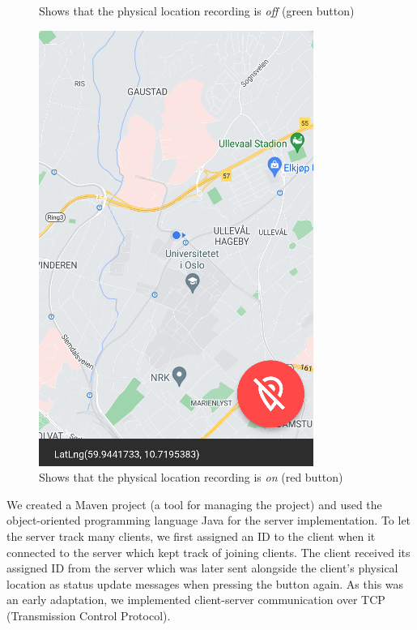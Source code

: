 \documentclass{article}
\begin{document}
\begin{figure}[H]
\begin{minipage}[c]{0.34\linewidth}
        \caption{Shows that the physical location recording is \emph{off} (green button)}
        \label{fig:recording_off}
    \end{minipage}
    \hfill
    \begin{minipage}[c]{0.34\linewidth}
        \includegraphics[width=\linewidth]{graphics/recording_on.png}
        \caption{Shows that the physical location recording is \emph{on} (red button)}
        \label{fig:recording_on}
    \end{minipage}
\end{figure}

We created a Maven project (a tool for managing the project) and used the object-oriented programming language Java for the server implementation. To let the server track many clients, we first assigned an ID to the client when it connected to the server which kept track of joining clients. The client received its assigned ID from the server which was later sent alongside the client's physical location as status update messages when pressing the button again. As this was an early adaptation, we implemented client-server communication over TCP (Transmission Control Protocol).
\end{document}
